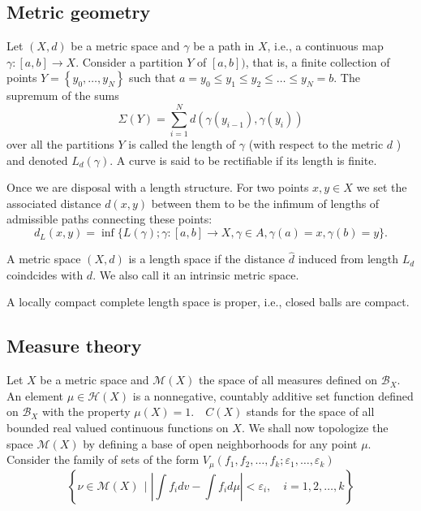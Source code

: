 \subsection{Metric geometry}
\begin{defn}
	\label{defn:length_structure}
	Let \( ( X , d ) \) be a metric space and \( \gamma \) be a path in \( X \), i.e., a continuous map \( \gamma: [ a , b ] \rightarrow X \). Consider a partition \( Y \) of \( [ a , b ] )\), that is, a finite collection of points \( Y = \left\{ y _ { 0 } , \ldots , y _ { N } \right\} \) such that \( a = y _ { 0 } \leq y _ { 1 } \leq y _ { 2 } \leq \ldots \leq y _ { N } = b \). The supremum of the sums
	\[
		\Sigma ( Y ) = \sum _ { i = 1 } ^ { N } d \left( \gamma \left( y _ { i - 1 } \right) , \gamma \left( y _ { i } \right) \right)
	\]
	over all the partitions $Y$ is called the length of $\gamma$ (with respect to the metric $d$ ) and denoted $L_d (\gamma)$. A curve is said to be rectifiable if its length is finite.
\end{defn}

Once we are disposal with a length structure. For two points \( x , y \in X \) we set the associated distance \( d ( x , y ) \) between them to be the infimum of lengths of admissible paths connecting these points:
\[
	d _ { L } ( x , y ) = \inf \{ L ( \gamma ) ; \gamma: [ a , b ] \rightarrow X , \gamma \in A , \gamma ( a ) = x , \gamma ( b ) = y \}.
\]

\begin{defn}
	\label{defn:length_space}
	A metric space $(X,d)$ is a length space if the distance $\hat{d}$ induced from length $L_d$ coindcides with $d$. We also call it an intrinsic metric space.
\end{defn}

\begin{prop}
	A locally compact complete length space is proper, i.e., closed balls are compact.
\end{prop}


\subsection{Measure theory}

Let \( X \) be a metric space and \( \mathscr { M } ( X ) \) the space of all measures defined on \( \mathscr { B } _ { X } . \) An element \( \mu \in \mathscr { H } ( X ) \) is a nonnegative, countably additive set function defined on \( \mathscr { B } _ { X } \) with the property \( \mu ( X ) = 1 . \quad C ( X ) \) stands for the space of all bounded real valued continuous functions on \( X \). We shall now topologize the space \( \mathscr { M } ( X ) \) by defining a base of open neighborhoods for any point \( \mu . \) Consider the family of sets of the form
\( V _ { \mu } \left( f _ { 1 } , f _ { 2 } , \ldots , f _ { k } ; \varepsilon _ { 1 } , \ldots , \varepsilon _ { k } \right) \)
\[ \left\{\nu \in \mathscr { M } ( X ) \, \mid  \left| \int f _ { i } d v - \int f _ { i } d \mu \right| < \varepsilon _ { i } , \quad i = 1,2 , \ldots , k \right\} \]

